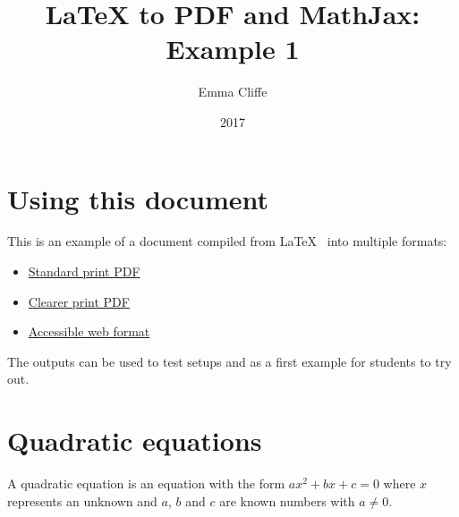 \documentclass[12pt,a4paper]{article}
\title{LaTeX to PDF and MathJax: Example 1}
\author{Emma Cliffe}
\date{2017}
\theoremstyle{clearprint}
\begin{document}
\maketitle

\tableofcontents
\listoffigures
\listoftables
\newpage

\setcounter{page}{1}

\section*{Using this document}

This is an example of a document compiled from \LaTeX~ into multiple formats:
\begin{itemize} 
\item \href{https://stem-enable.github.io/LaTeXtoPDFandMathJax-Example1/LaTeXtoPDFandMathJax-1-standard.pdf}{Standard print PDF}
\item \href{https://stem-enable.github.io/LaTeXtoPDFandMathJax-Example1/LaTeXtoPDFandMathJax-1-clear.pdf}{Clearer print PDF}
\item \href{https://stem-enable.github.io/LaTeXtoPDFandMathJax-Example1/}{Accessible web format}
\end{itemize}

The outputs can be used to test setups and as a first example for students to try out. 



\newpage
\section{Quadratic equations}

A quadratic equation is an equation with the form \(ax^2 + bx + c = 0\) where \(x\) represents an unknown and \(a\), \(b\) and \(c\) are known numbers with \(a \neq 0\). 
\end{document}
